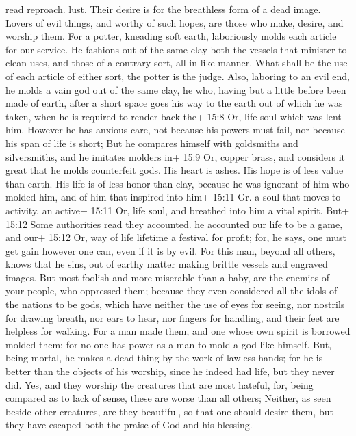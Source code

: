 read reproach. lust. Their desire is for the breathless form of a dead
image.  Lovers of evil things, and worthy of such hopes, are
those who make, desire, and worship them.  For a potter,
kneading soft earth, laboriously molds each article for our service. He
fashions out of the same clay both the vessels that minister to clean
uses, and those of a contrary sort, all in like manner. What shall be
the use of each article of either sort, the potter is the judge.
 Also, laboring to an evil end, he molds a vain god out of
the same clay, he who, having but a little before been made of earth,
after a short space goes his way to the earth out of which he was taken,
when he is required to render back the+ 15:8 Or, life soul which was
lent him.  However he has anxious care, not because his
powers must fail, nor because his span of life is short; But he compares
himself with goldsmiths and silversmiths, and he imitates molders in+
15:9 Or, copper brass, and considers it great that he molds counterfeit
gods.  His heart is ashes. His hope is of less value than
earth. His life is of less honor than clay,  because he was
ignorant of him who molded him, and of him that inspired into him+ 15:11
Gr. a soul that moves to activity. an active+ 15:11 Or, life soul, and
breathed into him a vital spirit.  But+ 15:12 Some
authorities read they accounted. he accounted our life to be a game, and
our+ 15:12 Or, way of life lifetime a festival for profit; for, he says,
one must get gain however one can, even if it is by evil. 
For this man, beyond all others, knows that he sins, out of earthy
matter making brittle vessels and engraved images.  But
most foolish and more miserable than a baby, are the enemies of your
people, who oppressed them;  because they even considered
all the idols of the nations to be gods, which have neither the use of
eyes for seeing, nor nostrils for drawing breath, nor ears to hear, nor
fingers for handling, and their feet are helpless for walking.
 For a man made them, and one whose own spirit is borrowed
molded them; for no one has power as a man to mold a god like himself.
 But, being mortal, he makes a dead thing by the work of
lawless hands; for he is better than the objects of his worship, since
he indeed had life, but they never did.  Yes, and they
worship the creatures that are most hateful, for, being compared as to
lack of sense, these are worse than all others;  Neither,
as seen beside other creatures, are they beautiful, so that one should
desire them, but they have escaped both the praise of God and his
blessing.

